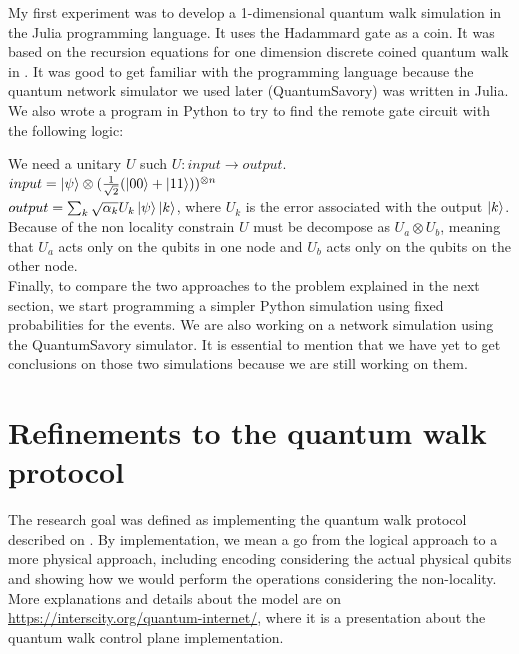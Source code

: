 \documentclass{article}
\begin{document}
    My first experiment was to develop a 1-dimensional quantum walk simulation in the Julia programming language. It uses the Hadammard gate as a coin. It was based on the recursion equations for one dimension discrete coined quantum walk in \cite{portugal}. It was good to get familiar with the programming language because the quantum network simulator we used later (QuantumSavory) was written in Julia.\\

    We also wrote a program in Python to try to find the remote gate circuit with the following logic:
        
    We need a unitary $U$ such $U: input \to output$. \\
    $input = \ket{\psi} \otimes (\frac{1}{\sqrt{2}}(\ket{00} + \ket{11}))^{\otimes n}$\\
    $output = \sum_{k} \sqrt{\alpha_{k}} U_{k} \ket{\psi}\ket{k} $, where $U_{k}$ is the error associated with the output $\ket{k}$. \\
    
    Because of the non locality constrain $U$ must be decompose as $U_a \otimes U_b$, meaning that $U_a$ acts only on the qubits in one node and $U_b$ acts only on the qubits on the other node.\\

    Finally, to compare the two approaches to the problem explained in the next section, we start programming a simpler Python simulation using fixed probabilities for the events. We are also working on a network simulation using the QuantumSavory simulator. It is essential to mention that we have yet to get conclusions on those two simulations because we are still working on them.
    
    
\section{Refinements to the quantum walk protocol}

    The research goal was defined as implementing the quantum walk protocol described on \cite{controlplane}. By implementation, we mean a go from the logical approach to a more physical approach, including encoding considering the actual physical qubits and showing how we would perform the operations considering the non-locality. More explanations and details about the model are on \href{https://interscity.org/quantum-internet/}{https://interscity.org/quantum-internet/}, where it is a presentation about the quantum walk control plane implementation.\\
\end{document}
